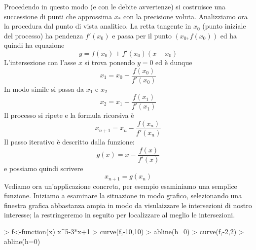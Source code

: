\documentclass[onecolumn,11pt]{book}
\begin{document}
Procedendo in questo modo (e con le debite avvertenze) si costruisce una successione di punti che approssima $x_*$ con la precisione voluta.
Analizziamo ora la procedura dal punto di vista analitico. La retta tangente in $x_0$ (punto iniziale del processo) ha pendenza $f'(x_0)$ e passa per il punto $(x_0,f(x_0))$ ed ha quindi ha equazione
\[ y=f(x_0)+f'(x_0)(x-x_0)\]
L'intersezione con l'asse $x$ si trova ponendo $y=0$ ed \`e dunque
\[x_1=x_0-\dfrac{f(x_0)}{f'(x_0)}\]
In modo simile si passa da $x_1$ e $x_2$
\[x_2=x_1-\dfrac{f(x_1)}{f'(x_1)}\]
Il processo si ripete e la formula ricorsiva \`e
\[x_{n+1}=x_n-\dfrac{f(x_n)}{f'(x_n)}\]
Il passo iterativo \`e descritto dalla funzione:
\[g(x)=x-\dfrac{f(x)}{f'(x)}\]
e possiamo quindi scrivere
\[x_{n+1}=g(x_n)\]
Vediamo ora un'applicazione concreta, per esempio esaminiamo una semplice funzione. Iniziamo a esaminare la situazione in modo grafico,  selezionando una finestra grafica abbastanza ampia in modo da visulaizzare le intersezioni di nostro interesse; la restringeremo in seguito per localizzare al meglio le intersezioni.

\begin{Schunk}
\begin{Sinput}
> f<-function(x) x^5-3*x+1
> curve(f,-10,10)
> abline(h=0)
> curve(f,-2,2)
> abline(h=0)
\end{Sinput}
\end{Schunk}
\end{document}
